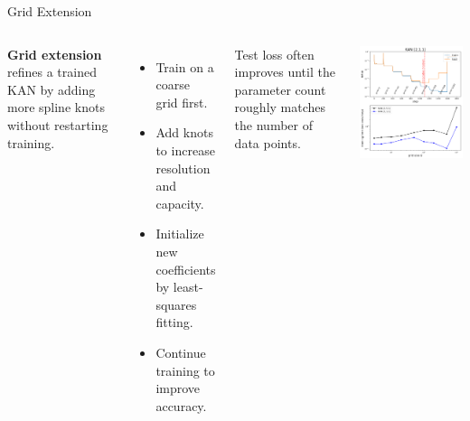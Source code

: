 \documentclass[aspectratio=169]{beamer}
\begin{document}

\begin{frame}{Grid Extension}
	\begin{columns}[T,onlytextwidth]
		
		\textbf{Grid extension} refines a trained KAN by adding more spline knots without restarting training.
		
		\begin{itemize}
			\item Train on a coarse grid first.
			\item Add knots to increase resolution and capacity.
			\item Initialize new coefficients by least-squares fitting.
			\item Continue training to improve accuracy.
		\end{itemize}
		
		Test loss often improves until the parameter count roughly matches the number of data points.
		
		\centering
		\includegraphics[height=0.8\textheight]{../images/grid_extension.png}
		
	\end{columns}
\end{frame}
\end{document}
